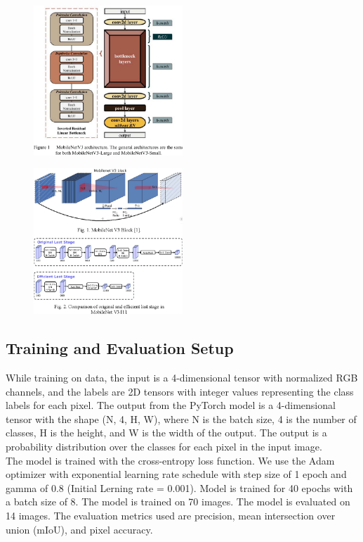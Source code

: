 \begin{figure}[ht]
    \centering
    \includegraphics[width=0.5\textwidth]{Images/mobilenet-1.png}
    \caption{\cite{mobilenet-1}}
    \label{fig:mobilenet-1}
\end{figure}

\begin{figure}[ht]
    \centering
    \includegraphics[width=0.5\textwidth]{Images/mobilenet-2.png}
    \caption{\cite{mobilenet-2}}
    \label{fig:mobilenet-2}
\end{figure}

\subsection{Training and Evaluation Setup}
While training on data, the input is a 4-dimensional tensor with normalized RGB channels, and the labels are 2D tensors with integer values representing the class labels for each pixel. The output from the PyTorch model is a 4-dimensional tensor with the shape (N, 4, H, W), where N is the batch size, 4 is the number of classes, H is the height, and W is the width of the output. The output is a probability distribution over the classes for each pixel in the input image. \\
The model is trained with the cross-entropy loss function. We use the Adam optimizer with exponential learning rate schedule with step size of 1 epoch and gamma of 0.8 (Initial Lerning rate = 0.001). Model is trained for 40 epochs with a batch size of 8. The model is trained on 70 images. The model is evaluated on 14 images. The evaluation metrics used are precision, mean intersection over union (mIoU), and pixel accuracy.

